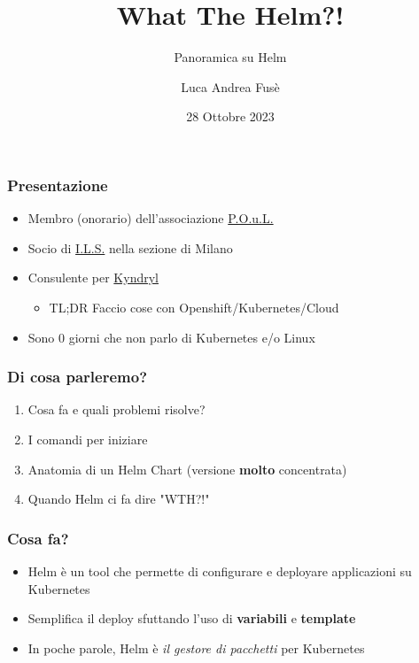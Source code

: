\documentclass{beamer}
\title{What The Helm?!}
\subtitle{Panoramica su Helm}
\author{Luca Andrea Fusè}
\date{28 Ottobre 2023}
\begin{document}
\renewcommand{\CancelColor}{\color{red}}

\begin{frame}
    \titlepage
\end{frame}
 
 \begin{frame}
     \frametitle{Presentazione}

    \begin{itemize}
        \item Membro (onorario) dell'associazione \href{https://www.poul.org}{P.O.u.L.}
        \item Socio di \href{https://www.ils.org}{I.L.S.} nella sezione di Milano
        \item Consulente per \href{https://www.kyndryl.com}{Kyndryl}
        \begin{itemize}\item TL;DR Faccio cose con Openshift/Kubernetes/Cloud \end{itemize}
        \item Sono 0 giorni che non parlo di Kubernetes e/o Linux
    \end{itemize}
 \end{frame}
 
 \begin{frame}
   \frametitle{Di cosa parleremo?}
   \begin{enumerate}
    \item Cosa fa e quali problemi risolve?
    \item I comandi per iniziare
    \item Anatomia di un Helm Chart (versione \textbf{molto} concentrata)
    \item Quando Helm ci fa dire "WTH?!"
   
   \end{enumerate}
  \end{frame}

\begin{frame}
\frametitle{Cosa fa?}
 \begin{itemize}
    \item Helm è un tool che permette di configurare e deployare applicazioni su Kubernetes
    \item Semplifica il deploy sfuttando l'uso di \textbf{variabili} e \textbf{template}
    \item In poche parole, Helm è \textit{il gestore di pacchetti} per Kubernetes
  \end{itemize}
\end{frame}
\end{document}
